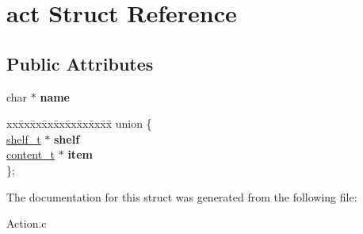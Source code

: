 \hypertarget{structact}{}\section{act Struct Reference}
\label{structact}
\subsection*{Public Attributes}
\begin{DoxyCompactItemize}
\item 
\hypertarget{structact_a83ed9b55fe1bc0f43124cb92d6df3c99}{}char $\ast$ {\bfseries name}\label{structact_a83ed9b55fe1bc0f43124cb92d6df3c99}

\item 
\hypertarget{structact_a8a13687d7a7850485b1e9dde1aafcdf2}{}\begin{tabbing}
xx\=xx\=xx\=xx\=xx\=xx\=xx\=xx\=xx\=\kill
union \{\\
\>\hyperlink{structshelf}{shelf\_t} $\ast$ {\bfseries shelf}\\
\>\hyperlink{structcontent}{content\_t} $\ast$ {\bfseries item}\\
\}; \label{structact_a8a13687d7a7850485b1e9dde1aafcdf2}
\\

\end{tabbing}\end{DoxyCompactItemize}


The documentation for this struct was generated from the following file\+:\begin{DoxyCompactItemize}
\item 
Action.\+c\end{DoxyCompactItemize}
